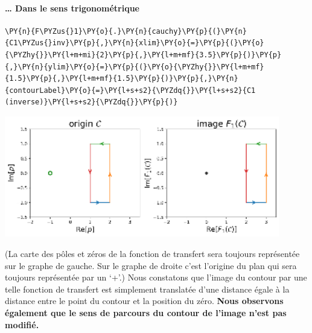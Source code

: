 \paragraph{\ldots{} Dans le sens trigonométrique\label{dans-le-sens-trigonomuxe9trique}}
\begin{tcolorbox}[breakable, size=fbox, boxrule=1pt, pad at break*=1mm,colback=cellbackground, colframe=cellborder]
\begin{Verbatim}[commandchars=\\\{\}]
\PY{n}{F\PYZus{}1}\PY{o}{.}\PY{n}{cauchy}\PY{p}{(}\PY{n}{C1\PYZus{}inv}\PY{p}{,}\PY{n}{xlim}\PY{o}{=}\PY{p}{(}\PY{o}{\PYZhy{}}\PY{l+m+mi}{2}\PY{p}{,}\PY{l+m+mf}{3.5}\PY{p}{)}\PY{p}{,}\PY{n}{ylim}\PY{o}{=}\PY{p}{(}\PY{o}{\PYZhy{}}\PY{l+m+mf}{1.5}\PY{p}{,}\PY{l+m+mf}{1.5}\PY{p}{)}\PY{p}{,}\PY{n}{contourLabel}\PY{o}{=}\PY{l+s+s2}{\PYZdq{}}\PY{l+s+s2}{C1 (inverse)}\PY{l+s+s2}{\PYZdq{}}\PY{p}{)}
\end{Verbatim}
\end{tcolorbox}
\begin{center}
    \includegraphics[width=0.9\textwidth]{notebook/fig/output_17_1.eps}
\end{center}
(La carte des pôles et zéros de la fonction de transfert sera toujours
représentée sur le graphe de gauche. Sur le graphe de droite c'est
l'origine du plan qui sera toujours représentée par un `+'.)
Nous constatons que l'image du contour par une telle fonction de
transfert est simplement translatée d'une distance égale à la distance
entre le point du contour et la position du zéro. \textbf{Nous observons
également que le sens de parcours du contour de l'image n'est pas
modifié.}
